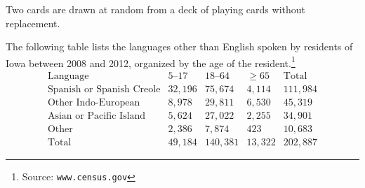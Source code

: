 \documentclass[addpoints,12pt]{exam}
\begin{document}
\begin{questions}

\question Two cards are drawn at random from a deck of playing cards
without replacement.
\begin{solution}
\end{solution}
\newpage

\question The following table lists
the languages other than English spoken by residents
of Iowa between 2008 and 2012, organized by the age
of the resident.\footnote{Source: {\tt www.census.gov}}
\[\begin{array}{r|rrr|r}
\text{Language}&\text{$5$--$17$}
&\text{$18$--$64$}&\ge 65&\text{Total}\\\hline
\text{Spanish or Spanish Creole}&32,196&75,674&4,114&111,984\\
\text{Other Indo-European}&8,978&29,811&6,530&45,319\\
\text{Asian or Pacific Island}&5,624&27,022&2,255&34,901\\
\text{Other}&2,386&7,874&423&10,683\\\hline
\text{Total}&49,184&140,381&13,322&202,887
\end{array}\]
\end{questions}
\end{document}
